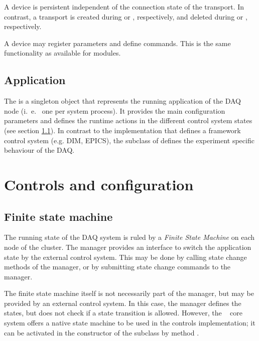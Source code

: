 A device is persistent independent of the connection state 
of the transport. In contrast, a transport is created 
during  or , respectively,
and deleted during  or , respectively. 

A device may register parameters and define 
commands. This is the same functionality as available for modules.   


\subsection{Application}
The  
is a singleton object that represents the running application of the DAQ node 
(i.~e.~ one per system process). It provides the main configuration parameters
and defines the runtime actions in the different control system states (see section \ref{prog_fsm}).
In contrast to the  implementation that defines a framework control system (e.g. DIM, EPICS), the subclass of  defines the experiment specific behaviour of the DAQ.


               
\section{Controls and configuration}
\subsection{Finite state machine}
\label{prog_fsm}

The running state of the DAQ system is ruled by a {\sl Finite State Machine} 
\cite{Wikipedia-Statemachine} 
on  each node of the cluster. The manager provides an interface to switch the application 
state by the external control system. This may be done by calling 
state change methods of the manager, or by submitting state change commands 
to the manager.

The finite state machine itself is not necessarily part of the manager,
but may be provided by an external control system. In this case,
the manager defines the states, but does not check if a state transition is allowed. 
However, the \dabc~ core system offers a native state machine to be used
in the controls implementation; it can be
activated in the constructor of the  subclass 
by method .      
      
